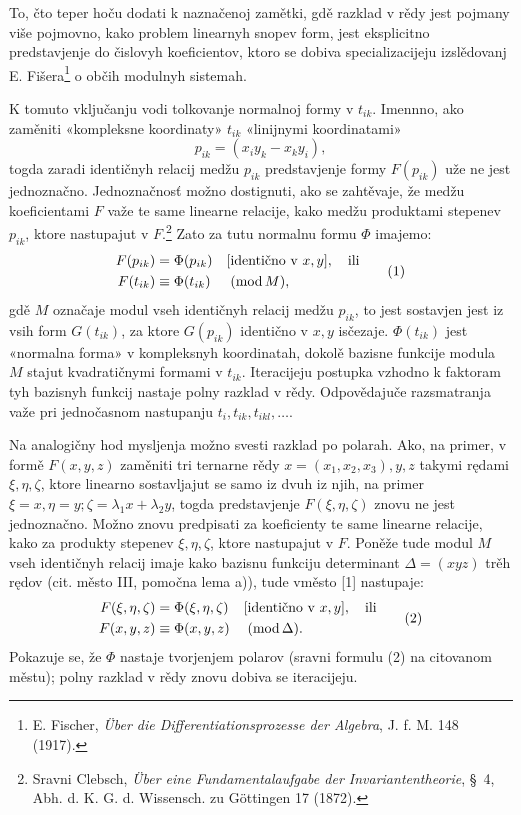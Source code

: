 \documentclass[11pt]{article}
\providecommand{\modu}[1]{\;(\operatorname{mod} #1)}
\begin{document}
To, čto teper hoču dodati k naznačenoj zamětki, gdě razklad v rědy jest pojmany više pojmovno, kako problem linearnyh snopev form, jest eksplicitno predstavjenje do čislovyh koeficientov, ktoro se dobiva specializacijeju izslědovanj E. Fišera\footnote{E. Fischer, \emph{Über die Differentiationsprozesse der Algebra}, J. f. M. 148 (1917).} o občih modulnyh sistemah.

K tomuto vključanju vodi tolkovanje normalnoj formy v \(t_{ik}\). Imennno, ako zaměniti «kompleksne koordinaty» \(t_{ik}\) «linijnymi koordinatami»
\[
        p_{ik}=(x_i y_k-x_k y_i),
\]
togda zaradi identičnyh relacij medžu \(p_{ik}\) predstavjenje formy \(F(p_{ik})\) uže ne jest jednoznačno. Jednoznačnosť možno dostignuti, ako se zahtěvaje, že medžu koeficientami \(F\) važe te same linearne relacije, kako medžu produktami stepenev \(p_{ik}\), ktore nastupajut v \(F\).\footnote{Sravni Clebsch, \emph{Über eine Fundamentalaufgabe der Invariantentheorie}, \S~4, Abh. d. K. G. d. Wissensch. zu Göttingen 17 (1872).} Zato za tutu normalnu formu \(\Phi\) imajemo:
\begin{equation}
\begin{aligned}
        F(p_{ik})&=\Phi(p_{ik}) &&[\text{identično v }x,y],\quad\text{ili}\notag\\
        F(t_{ik})&\equiv\Phi(t_{ik}) &&\modu{M},
\end{aligned}
\tag{1}
\end{equation}
gdě \(M\) označaje modul vseh identičnyh relacij medžu \(p_{ik}\), to jest sostavjen jest iz vsih form \(G(t_{ik})\), za ktore \(G(p_{ik})\) identično v \(x,y\) isčezaje. \(\Phi(t_{ik})\) jest «normalna forma» v kompleksnyh koordinatah, dokolě bazisne funkcije modula \(M\) stajut kvadratičnymi formami v \(t_{ik}\). Iteracijeju postupka vzhodno k faktoram tyh bazisnyh funkcij nastaje polny razklad v rědy. Odpovědajuče razsmatranja važe pri jednočasnom nastupanju \(t_i,t_{ik},t_{ikl},\ldots\).

Na analogičny hod mysljenja možno svesti razklad po polarah. Ako, na primer, v formě \(F(x,y,z)\) zaměniti tri ternarne rědy \(x=(x_1,x_2,x_3),y,z\) takymi rędami \(\xi,\eta,\zeta\), ktore linearno sostavljajut se samo iz dvuh iz njih, na primer \(\xi=x,\eta=y;\zeta=\lambda_1x+\lambda_2y\), togda predstavjenje \(F(\xi,\eta,\zeta)\) znovu ne jest jednoznačno. Možno znovu predpisati za koeficienty te same linearne relacije, kako za produkty stepenev \(\xi,\eta,\zeta\), ktore nastupajut v \(F\). Poněže tude modul \(M\) vseh identičnyh relacij imaje kako bazisnu funkciju determinant \(\Delta=(xyz)\) trěh rędov (cit. město III, pomočna lema a)), tude vměsto [1] nastupaje:
\begin{equation}
\begin{aligned}
        F(\xi,\eta,\zeta)&=\Phi(\xi,\eta,\zeta)&&[\text{identično v }x,y],\quad\text{ili}\notag\\
        F(x,y,z)&\equiv\Phi(x,y,z)&&\modu{\Delta}.
\end{aligned}
\tag{2}
\end{equation}
Pokazuje se, že \(\Phi\) nastaje tvorjenjem polarov (sravni formulu (2) na citovanom městu); polny razklad v rědy znovu dobiva se iteracijeju.
\end{document}

